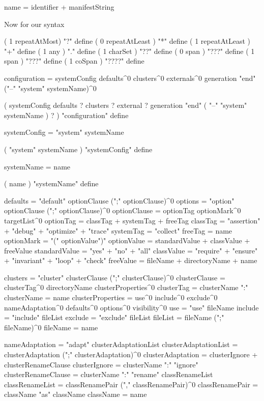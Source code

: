 name = identifier + manifestString
\stoptyping

Now for our syntax

\startJoylol
( 1 repeatAtMost) "?" define
( 0 repeatAtLeast ) "*" define
( 1 repeatAtLeast ) "+" define
( 1 any ) "." define
( 1 charSet ) "??" define
( 0 span ) "???" define
( 1 span ) "???" define
( 1 coSpan ) "????" define
\stopJoylol

\starttyping
configuration = systemConfig 
  defaults^0 
  clusters^0 
  externals^0 
  generation
  "end" ("--" "system" systemName)^0
\stoptyping

\startJoylol
(
  systemConfig
  defaults ?
  clusters ?
  external ?
  generation
  "end" ( "--" "system" systemName ) ?
) "configuration" define
\stopJoylol

\starttyping
systemConfig = "system" systemName
\stoptyping

\startJoylol
( "system" systemName ) "systemConfig" define
\stopJoylol

\starttyping
systemName   = name
\stoptyping

\startJoylol
( name ) "systemName" define
\stopJoylol

\starttyping
defaults = "default" optionClause (";" optionClause)^0
options  = "option" optionClause (";" optionClause)^0
optionClause = optionTag optionMark^0 targetList^0
optionTag    = classTag + systemTag + freeTag
classTag     = "assertion" + "debug" + "optimize" + "trace"
systemTag    = "collect"
freeTag      = name
optionMark   = "(" optionValue")"
optionValue  = standardValue + classValue + freeValue
standardValue = "yes" + "no" + "all"
classValue    = "require" + "ensure" + "invariant" + "loop" + "check"
freeValue     = fileName + directoryName + name

clusters = "cluster" clusterClause (";" clusterClause)^0
clusterClause = clusterTag^0 directoryName clusterProperties^0
clusterTag    = clusterName ":"
clusterName   = name
clusterProperties = use^0
  include^0
  exclude^0
  nameAdaptation^0
  defaults^0
  options^0
  visibility^0
use = "use" fileName
include = "include" fileList
exclude = "exclude" fileList
fileList = fileName (";" fileName)^0
fileName = name

nameAdaptation = "adapt" clusterAdaptationList
clusterAdaptationList = clusterAdaptation (";" clusterAdaptation)^0
clusterAdaptation = clusterIgnore + clusterRenameClause
clusterIgnore = clusterName ":" "ignore"
clusterRenameClause = clusterName ":" "rename" classRenameList
classRenameList = classRenamePair ("," classRenamePair)^0
classRenamePair = className "as" className
className = name

